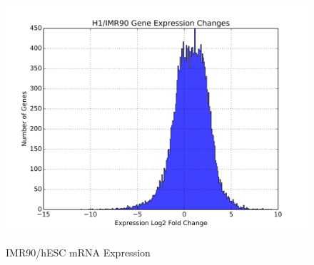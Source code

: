 \begin{figure}[H]
  \includegraphics[width=\textwidth]{./figures/supplementary/expressionDelta.png}\label{fig:i90h1expression}
  \caption{IMR90/hESC mRNA Expression}
\end{figure}

